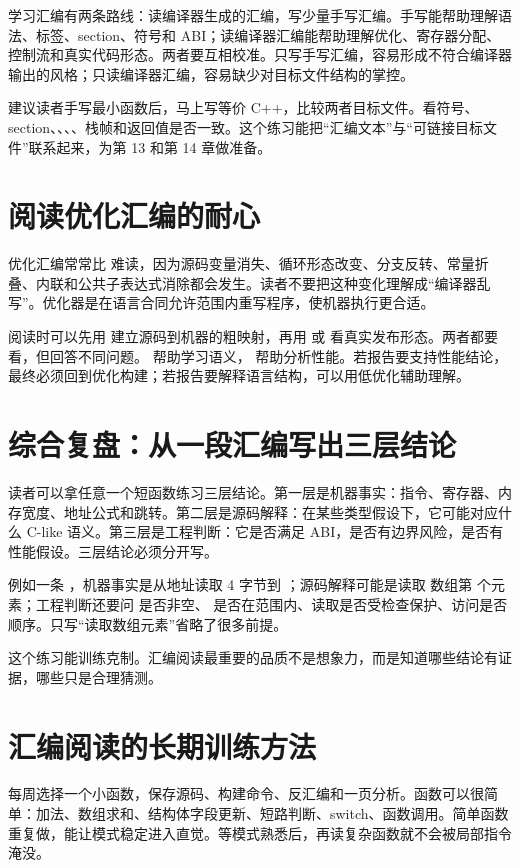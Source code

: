 学习汇编有两条路线：读编译器生成的汇编，写少量手写汇编。手写能帮助理解语法、标签、section、符号和 ABI；读编译器汇编能帮助理解优化、寄存器分配、控制流和真实代码形态。两者要互相校准。只写手写汇编，容易形成不符合编译器输出的风格；只读编译器汇编，容易缺少对目标文件结构的掌控。

建议读者手写最小函数后，马上写等价 C++，比较两者目标文件。看符号、section、、、、栈帧和返回值是否一致。这个练习能把“汇编文本”与“可链接目标文件”联系起来，为第 13 和第 14 章做准备。

\section{阅读优化汇编的耐心}

优化汇编常常比  难读，因为源码变量消失、循环形态改变、分支反转、常量折叠、内联和公共子表达式消除都会发生。读者不要把这种变化理解成“编译器乱写”。优化器是在语言合同允许范围内重写程序，使机器执行更合适。

阅读时可以先用  建立源码到机器的粗映射，再用  或  看真实发布形态。两者都要看，但回答不同问题。 帮助学习语义， 帮助分析性能。若报告要支持性能结论，最终必须回到优化构建；若报告要解释语言结构，可以用低优化辅助理解。

\section{综合复盘：从一段汇编写出三层结论}

读者可以拿任意一个短函数练习三层结论。第一层是机器事实：指令、寄存器、内存宽度、地址公式和跳转。第二层是源码解释：在某些类型假设下，它可能对应什么 C-like 语义。第三层是工程判断：它是否满足 ABI，是否有边界风险，是否有性能假设。三层结论必须分开写。

例如一条 ，机器事实是从地址读取 4 字节到 ；源码解释可能是读取  数组第  个元素；工程判断还要问  是否非空、 是否在范围内、读取是否受检查保护、访问是否顺序。只写“读取数组元素”省略了很多前提。

这个练习能训练克制。汇编阅读最重要的品质不是想象力，而是知道哪些结论有证据，哪些只是合理猜测。

\section{汇编阅读的长期训练方法}

每周选择一个小函数，保存源码、构建命令、反汇编和一页分析。函数可以很简单：加法、数组求和、结构体字段更新、短路判断、switch、函数调用。简单函数重复做，能让模式稳定进入直觉。等模式熟悉后，再读复杂函数就不会被局部指令淹没。

